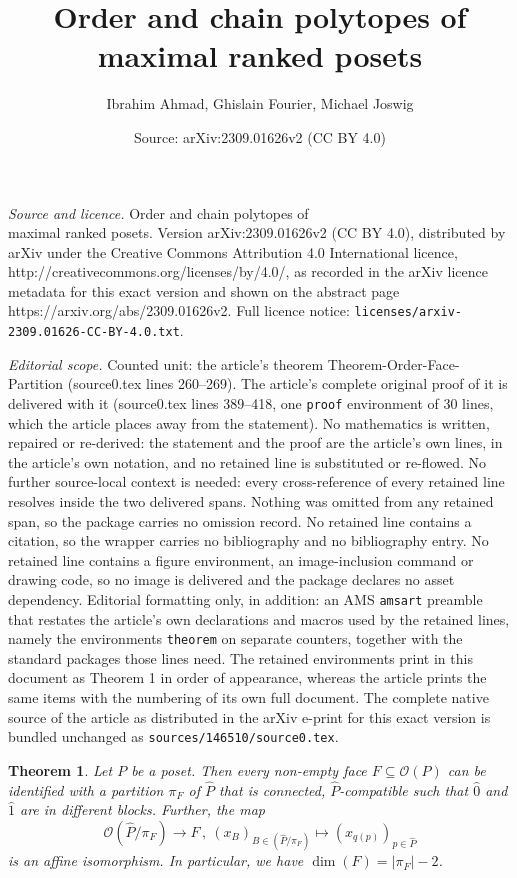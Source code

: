 \documentclass[10pt,a4paper]{amsart}
\title{Order and chain polytopes of \\ maximal ranked posets}
\author{Ibrahim Ahmad, Ghislain Fourier, Michael Joswig}
\date{Source: arXiv:2309.01626v2 (CC BY 4.0)}
\newtheorem{theorem}{Theorem}
\newcommand{\OP}{\mathcal{O}}
\begin{document}
\maketitle

\noindent\emph{Source and licence.} Order and chain polytopes of \\ maximal ranked posets. Version arXiv:2309.01626v2 (CC BY 4.0), distributed by arXiv under the Creative Commons Attribution 4.0 International licence, http://creativecommons.org/licenses/by/4.0/, as recorded in the arXiv licence metadata for this exact version and shown on the abstract page https://arxiv.org/abs/2309.01626v2. Full licence notice: \texttt{licenses/arxiv-2309.01626-CC-BY-4.0.txt}.\par\smallskip

\noindent\textit{Editorial scope.} Counted unit: the article's theorem Theorem-Order-Face-Partition (source0.tex lines 260--269). The article's complete original proof of it is delivered with it (source0.tex lines 389--418, one \texttt{proof} environment of 30 lines, which the article places away from the statement). No mathematics is written, repaired or re-derived: the statement and the proof are the article's own lines, in the article's own notation, and no retained line is substituted or re-flowed.  No further source-local context is needed: every cross-reference of every retained line resolves inside the two delivered spans.  Nothing was omitted from any retained span, so the package carries no omission record.  No retained line contains a citation, so the wrapper carries no bibliography and no bibliography entry.  No retained line contains a figure environment, an image-inclusion command or drawing code, so no image is delivered and the package declares no asset dependency.  Editorial formatting only, in addition: an AMS \texttt{amsart} preamble that restates the article's own declarations and macros used by the retained lines, namely the environments \texttt{theorem} on separate counters, together with the standard packages those lines need.  The retained environments print in this document as Theorem 1 in order of appearance, whereas the article prints the same items with the numbering of its own full document.  The complete native source of the article as distributed in the arXiv e-print for this exact version is bundled unchanged as \texttt{sources/146510/source0.tex}.
\begin{theorem}\label{Theorem-Order-Face-Partition}
Let $P$ be a poset. 
Then every non-empty face $F\subseteq\OP(P)$ can be identified with a partition $\pi_F$ of $\hat{P}$ that is connected, $\hat{P}$-compatible such that $\hat{0}$ and $\hat{1}$ are in different blocks.
Further, the map
\[
  \OP(\hat{P}/\pi_F)\rightarrow F \,,\ (x_{B})_{B\in (\hat{P}/\pi_{F})}\mapsto(x_{q(p)})_{p\in \hat{P}}
\]
is an affine isomorphism.
In particular, we have $\dim(F)=|\pi_F|-2$.
\end{theorem}
\end{document}
